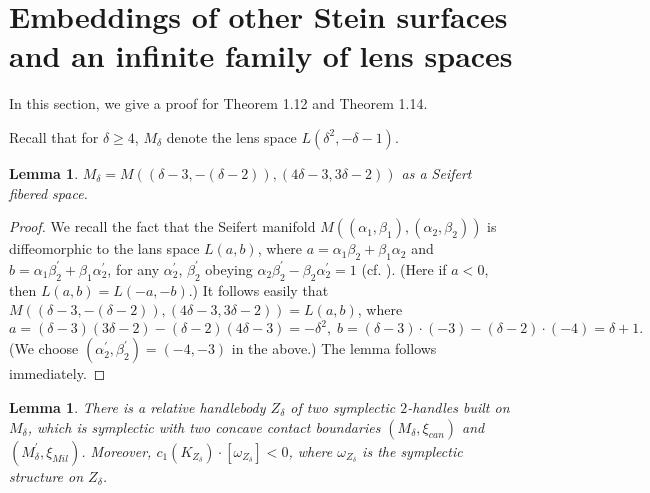 \documentclass[11pt]{amsart}
\theoremstyle{plain}
\numberwithin{theorem}{section}
\newtheorem{lemma}[theorem]{Lemma}
\theoremstyle{definition}
\begin{document}
\section{Embeddings of other Stein surfaces and an infinite family of lens spaces}

In this section, we give a proof for Theorem 1.12 and Theorem 1.14. 

Recall that for $\delta\geq 4$, $M_\delta$ denote the lens space $L(\delta^2,-\delta-1)$.

\begin{lemma}
$M_\delta=M((\delta-3,-(\delta-2)), (4\delta-3,3\delta-2))$ as a Seifert fibered space. 
\end{lemma}

\begin{proof}
We recall the fact that the Seifert manifold $M((\alpha_1,\beta_1), (\alpha_2,\beta_2))$
is diffeomorphic to the lans space $L(a,b)$, where $a=\alpha_1\beta_2+\beta_1\alpha_2$ and $b=\alpha_1\beta_2^\prime+\beta_1\alpha_2^\prime$, for any $\alpha_2^\prime$, $\beta_2^\prime$ obeying $\alpha_2\beta_2^\prime-\beta_2\alpha_2^\prime=1$ (cf. \cite{N}). (Here if $a<0$, then $L(a,b)=L(-a,-b)$.) It follows easily that $M((\delta-3,-(\delta-2)), (4\delta-3,3\delta-2))=L(a,b)$, where 
$$
a=(\delta-3)(3\delta-2)-(\delta-2)(4\delta-3)=-\delta^2, \; b=(\delta-3)\cdot (-3)-(\delta-2)\cdot (-4)=\delta+1.
$$
(We choose $(\alpha_2^\prime,\beta_2^\prime)=(-4,-3)$ in the above.) The lemma follows immediately.

\end{proof}

\begin{lemma}
There is a relative handlebody $Z_\delta$ of two symplectic $2$-handles built on $M_\delta$,
which is symplectic with two concave contact boundaries $(M_\delta,\xi_{can})$ and
$(M_\delta^\prime,\xi_{Mil})$. Moreover, $c_1(K_{Z_\delta})\cdot [\omega_{Z_\delta}]<0$,
where $\omega_{Z_\delta}$ is the symplectic structure on $Z_\delta$.
\end{lemma}
\end{document}
